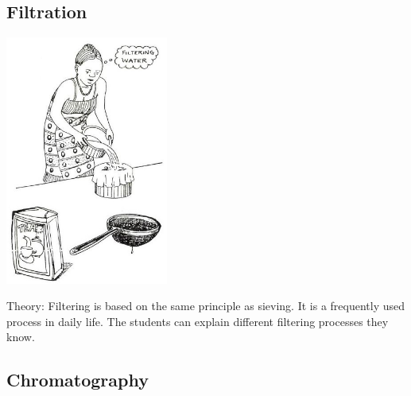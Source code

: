 \begin{multicols}{2}
\subsection{Filtration}

\begin{center}
\includegraphics[width=0.4\textwidth]{./img/source/filtering.jpg}
\end{center}

\begin{description*}
\item[Theory:]{Filtering is based on the same principle as
sieving. It is a frequently used process in daily
life. The students can explain different filtering
processes they know.}
\end{description*}

\subsection{Chromatography} %


\end{multicols}
